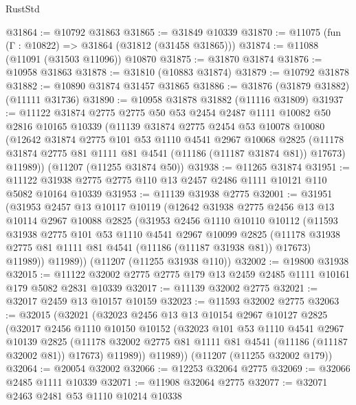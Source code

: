 \begin{lexlean}{RustStd}
\begin{coremodule}
@31864 := @10792 @31863
@31865 := @31849 @10339
@31870 := @11075 (fun (Γ : @10822) => @31864 (@31812 (@31458 @31865)))
@31874 := @11088 (@11091 (@31503 @11096)) @10870
@31875 := @31870 @31874
@31876 := @10958 @31863
@31878 := @31810 (@10883 @31874)
@31879 := @10792 @31878
@31882 := @10890 @31874 @31457 @31865
@31886 := @31876 (@31879 @31882) (@11111 @31736)
@31890 := @10958 @31878 @31882 (@11116 @31809)
@31937 := @11122
    @31874
    @2775
    @2775
    @50
    @53
    @2454
    @2487
    @1111
    @10082
    @50
    @2816
    @10165
    @10339
    (@11139
      @31874
      @2775
      @2454
      @53
      @10078
      @10080
      (@12642
        @31874
        @2775
        @101
        @53
        @1110
        @4541
        @2967
        @10068
        @2825
        (@11178 @31874 @2775 @81 @1111 @81 @4541 (@11186 (@11187 @31874 @81)) @17673)
        @11989))
    (@11207 (@11255 @31874 @50))
@31938 := @11265 @31874
@31951 := @11122 @31938 @2775 @2775 @110 @13 @2457 @2486 @1111 @10121 @110 @5082 @10164 @10339
@31953 := @11139 @31938 @2775
@32001 := @31951
    (@31953
      @2457
      @13
      @10117
      @10119
      (@12642
        @31938
        @2775
        @2456
        @13
        @13
        @10114
        @2967
        @10088
        @2825
        (@31953
          @2456
          @1110
          @10110
          @10112
          (@11593
            @31938
            @2775
            @101
            @53
            @1110
            @4541
            @2967
            @10099
            @2825
            (@11178 @31938 @2775 @81 @1111 @81 @4541 (@11186 (@11187 @31938 @81)) @17673)
            @11989))
        @11989))
    (@11207 (@11255 @31938 @110))
@32002 := @19800 @31938
@32015 := @11122 @32002 @2775 @2775 @179 @13 @2459 @2485 @1111 @10161 @179 @5082 @2831 @10339
@32017 := @11139 @32002 @2775
@32021 := @32017 @2459 @13 @10157 @10159
@32023 := @11593 @32002 @2775
@32063 := @32015
    (@32021
      (@32023
        @2456
        @13
        @13
        @10154
        @2967
        @10127
        @2825
        (@32017
          @2456
          @1110
          @10150
          @10152
          (@32023
            @101
            @53
            @1110
            @4541
            @2967
            @10139
            @2825
            (@11178 @32002 @2775 @81 @1111 @81 @4541 (@11186 (@11187 @32002 @81)) @17673)
            @11989))
        @11989))
    (@11207 (@11255 @32002 @179))
@32064 := @20054 @32002
@32066 := @12253 @32064 @2775
@32069 := @32066 @2485 @1111 @10339
@32071 := @11908 @32064 @2775
@32077 := @32071 @2463 @2481 @53 @1110 @10214 @10338

\end{coremodule}
\end{lexlean}
